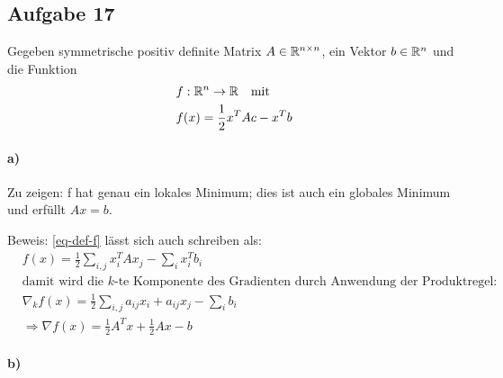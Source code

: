 \subsection*{Aufgabe 17}
Gegeben symmetrische positiv definite Matrix $A \in \mathbb R^{n \times n}$, ein Vektor
$b \in \mathbb R^n$ und die Funktion
\begin{align}
  \nonumber
  & f : \mathbb R^n \rightarrow \mathbb R \quad \text{mit}\\
  \label{eq-def-f}
  & f(x) = \frac{1}{2} x^T A c - x^T b
\end{align}

\paragraph*{a)}
Zu zeigen: f hat genau ein lokales Minimum; dies ist auch ein globales Minimum
und erfüllt $A x = b$.

Beweis: \eqref{eq-def-f} lässt sich auch schreiben als:
\begin{align*}
  &f(x) =  \frac{1}{2} \sum_{i, j}x_i^T A x_j - \sum_i x_i^T b_i\\
  &\text{damit wird die $k$-te Komponente des Gradienten durch Anwendung der Produktregel:}\\
  &\nabla_k f(x)=\frac{1}{2}\sum_{i,j}a_{ij}x_i+ a_{ij}x_j-\sum_i b_i\\
  &\Rightarrow \nabla f(x)=\frac{1}{2}A^Tx+\frac{1}{2}Ax-b
\end{align*}



\paragraph*{b)}
